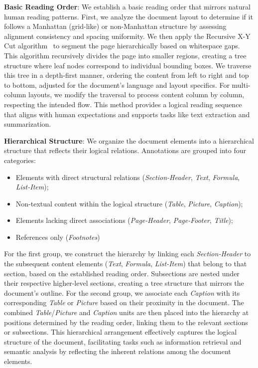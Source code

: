 \noindent \textbf{Basic Reading Order}: We establish a basic reading order that mirrors natural human reading patterns. First, we analyze the document layout to determine if it follows a Manhattan (grid-like) or non-Manhattan structure by assessing alignment consistency and spacing uniformity. We then apply the Recursive X-Y Cut algorithm~\citep{xycut} to segment the page hierarchically based on whitespace gaps. This algorithm recursively divides the page into smaller regions, creating a tree structure where leaf nodes correspond to individual bounding boxes. We traverse this tree in a depth-first manner, ordering the content from left to right and top to bottom, adjusted for the document's language and layout specifics. For multi-column layouts, we modify the traversal to process content column by column, respecting the intended flow. This method provides a logical reading sequence that aligns with human expectations and supports tasks like text extraction and summarization.

\noindent \textbf{Hierarchical Structure}: We organize the document elements into a hierarchical structure that reflects their logical relations. Annotations are grouped into four categories: 
\begin{itemize}
    \item Elements with direct structural relations (\textit{Section-Header}, \textit{Text}, \textit{Formula}, \textit{List-Item});
    \item Non-textual content within the logical structure (\textit{Table}, \textit{Picture}, \textit{Caption});
    \item Elements lacking direct associations (\textit{Page-Header}, \textit{Page-Footer}, \textit{Title}); 
    \item References only (\textit{Footnotes})
\end{itemize}

For the first group, we construct the hierarchy by linking each \textit{Section-Header} to the subsequent content elements (\textit{Text}, \textit{Formula}, \textit{List-Item}) that belong to that section, based on the established reading order. Subsections are nested under their respective higher-level sections, creating a tree structure that mirrors the document's outline. For the second group, we associate each \textit{Caption} with its corresponding \textit{Table} or \textit{Picture} based on their proximity in the document. The combined \textit{Table}/\textit{Picture} and \textit{Caption} units are then placed into the hierarchy at positions determined by the reading order, linking them to the relevant sections or subsections. This hierarchical arrangement effectively captures the logical structure of the document, facilitating tasks such as information retrieval and semantic analysis by reflecting the inherent relations among the document elements.

